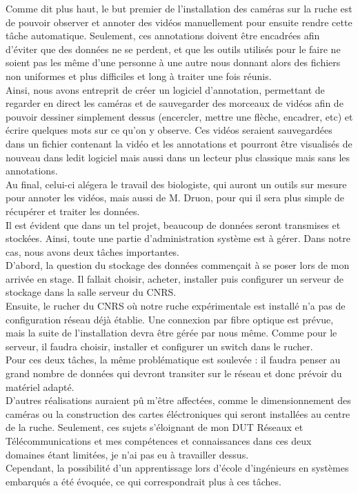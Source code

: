\documentclass[11pt,french,a4paper]{report}
\begin{document}
Comme dit plus haut, le but premier de l'installation des caméras sur la ruche est de pouvoir observer et annoter des vidéos manuellement
pour ensuite rendre cette tâche automatique. Seulement, ces annotations doivent être encadrées afin d'éviter que des données ne se perdent, 
et que les outils utilisés pour le faire ne soient pas les même d'une personne à une autre nous donnant alors des fichiers non 
uniformes et plus difficiles et long à traiter une fois réunis. \\
Ainsi, nous avons entreprit de créer un logiciel d'annotation, permettant de regarder en direct les caméras et de sauvegarder des 
morceaux de vidéos afin de pouvoir dessiner simplement dessus (encercler, mettre une flèche, encadrer, etc) et écrire quelques mots
sur ce qu'on y observe. Ces vidéos seraient sauvegardées dans un fichier contenant la vidéo et les annotations et pourront être 
visualisés de nouveau dans ledit logiciel mais aussi dans un lecteur plus classique mais sans les annotations. \\
Au final, celui-ci alégera le travail des biologiste, qui auront un outils sur mesure pour annoter les vidéos, mais aussi de M. Druon, 
pour qui il sera plus simple de récupérer et traiter les données.\\

Il est évident que dans un tel projet, beaucoup de données seront transmises et stockées. Ainsi, toute une partie d'administration 
système est à gérer. Dans notre cas, nous avons deux tâches importantes.\\
D'abord, la question du stockage des données commençait à se poser lors de mon arrivée en stage. Il fallait choisir, acheter, installer
puis configurer un serveur de stockage dans la salle serveur du CNRS.\\
Ensuite, le rucher du CNRS où notre ruche expérimentale est installé n'a pas de configuration réseau déjà établie. 
Une connexion par fibre optique est prévue, mais la suite de l'installation devra être gérée par nous même. Comme pour le serveur, 
il faudra choisir, installer et configurer un switch dans le rucher.\\
Pour ces deux tâches, la même problématique est soulevée : il faudra penser au grand nombre de données qui devront transiter sur le 
réseau et donc prévoir du matériel adapté.\\
D'autres réalisations auraient pû m'être affectées, comme le dimensionnement des caméras ou la construction des cartes éléctroniques
qui seront installées au centre de la ruche. Seulement, ces sujets s'éloignant de mon DUT Réseaux et Télécommunications et mes 
compétences et connaissances dans ces deux domaines étant limitées, je n'ai pas eu à travailler dessus.\\
Cependant, la possibilité d'un apprentissage lors d'école d'ingénieurs en systèmes embarqués a été évoquée, ce qui correspondrait 
plus à ces tâches.\\
\end{document}
